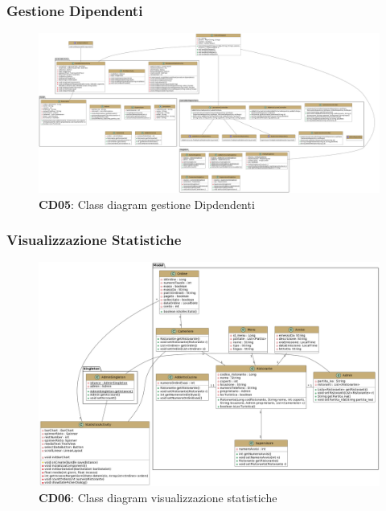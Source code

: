     \subsubsection{Gestione Dipendenti}
        \begin{figure}[H]
            \centering
            \includegraphics[scale=0.15]{assets/diagrammi/Class diagram di design/gestione dipendenti.png}
            \caption*{\textbf{CD05}: Class diagram gestione Dipdendenti}\label{fig:ClassDiagram_ManageWorkers}
        \end{figure}
    
    \subsubsection{Visualizzazione Statistiche}
        \begin{figure}[H]
            \centering
            \includegraphics[scale=0.2]{assets/diagrammi/Class diagram di design/gestione statistiche.png}
            \caption*{\textbf{CD06}: Class diagram visualizzazione statistiche}\label{fig:ClassDiagram_ViewStats}
        \end{figure}
